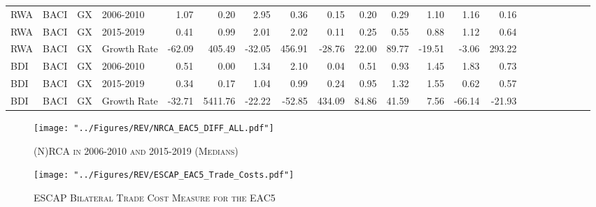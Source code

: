 \documentclass[a4paper]{article}
\begin{document}
\begin{table}[ht]
{\begin{tabular}{llllrrrrrrrrrrrrrrrrr}
  RWA & BACI & GX & 2006-2010 & 1.07 & 0.20 & 2.95 & 0.36 & 0.15 & 0.20 & 0.29 & 1.10 & 1.16 & 0.16 &  &  &  &  &  &  &  \\ 
  RWA & BACI & GX & 2015-2019 & 0.41 & 0.99 & 2.01 & 2.02 & 0.11 & 0.25 & 0.55 & 0.88 & 1.12 & 0.64 &  &  &  &  &  &  &  \\ 
  RWA & BACI & GX & Growth Rate & -62.09 & 405.49 & -32.05 & 456.91 & -28.76 & 22.00 & 89.77 & -19.51 & -3.06 & 293.22 &  &  &  &  &  &  &  \\ 
  BDI & BACI & GX & 2006-2010 & 0.51 & 0.00 & 1.34 & 2.10 & 0.04 & 0.51 & 0.93 & 1.45 & 1.83 & 0.73 &  &  &  &  &  &  &  \\ 
  BDI & BACI & GX & 2015-2019 & 0.34 & 0.17 & 1.04 & 0.99 & 0.24 & 0.95 & 1.32 & 1.55 & 0.62 & 0.57 &  &  &  &  &  &  &  \\ 
  BDI & BACI & GX & Growth Rate & -32.71 & 5411.76 & -22.22 & -52.85 & 434.09 & 84.86 & 41.59 & 7.56 & -66.14 & -21.93 &  &  &  &  &  &  &  \\ \bottomrule
\end{tabular}
}
\end{table}





\begin{figure}[h!]
\centering
\caption{\label{fig:NRCA_Diff}\textsc{(N)RCA in 2006-2010 and 2015-2019 (Medians)}}
\texttt{[image: "../Figures/REV/NRCA\_EAC5\_DIFF\_ALL.pdf"]} %
\end{figure}
\FloatBarrier


\begin{figure}[h!]
\centering
\caption{\label{fig:ESCAP_EAC}\textsc{ESCAP Bilateral Trade Cost Measure for the EAC5}}
\texttt{[image: "../Figures/REV/ESCAP\_EAC5\_Trade\_Costs.pdf"]} %
\end{figure}
\FloatBarrier
\end{document}
